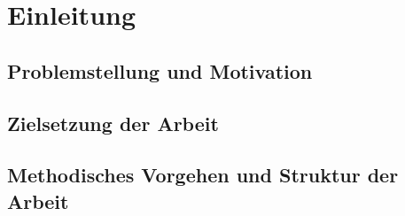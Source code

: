 \chapter{Einleitung} 

\section{Problemstellung und Motivation} 
\section{Zielsetzung der Arbeit} 
\section{Methodisches Vorgehen und Struktur der Arbeit} 